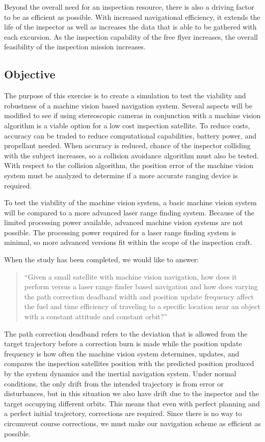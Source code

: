 \documentclass[journal, 10pt]{IEEEtran}
\begin{document}
Beyond the overall need for an inspection resource, there is also a driving factor to be as efficient as possible.  With increased navigational efficiency, it extends the life of the inspector as well as increases the data that is able to be gathered with each excursion.  As the inspection capability of the free flyer increases, the overall feasibility of the inspection mission increases.


\subsection{Objective}
The purpose of this exercise is to create a simulation to test the viability and robustness of a machine vision based navigation system.  Several aspects will be modified to see if using stereoscopic cameras in conjunction with a machine vision algorithm is a viable option for a low cost inspection satellite.  To reduce costs, accuracy can be traded to reduce computational capabilities, battery power, and propellant needed.  When accuracy is reduced, chance of the inspector colliding with the subject increases, so a collision avoidance algorithm must also be tested.  With respect to the collision algorithm, the position error of the machine vision system must be analyzed to determine if a more accurate ranging device is required.

To test the viability of the machine vision system, a basic machine vision system will be compared to a more advanced laser range finding system.  Because of the limited processing power available, advanced machine vision systems are not possible.  The processing power required for a laser range finding system is minimal, so more advanced versions fit within the scope of the inspection craft.

When the study has been completed, we would like to answer:

\begin{quote}
“Given a small satellite with machine vision navigation, how does it perform versus a laser range finder based navigation and how does varying the path correction deadband width and position update frequency affect the fuel and time efficiency of traveling to a specific location near an object with a constant attitude and constant orbit?”
\end{quote}

The path correction deadband refers to the deviation that is allowed from the target trajectory before a correction burn is made while the position update frequency is how often the machine vision system determines, updates, and compares the inspection satellites position with the predicted position produced by the system dynamics and the inertial navigation system.  Under normal conditions, the only drift from the intended trajectory is from error or disturbances, but in this situation we also have drift due to the inspector and the target occupying different orbits.  This means that even with perfect planning and a perfect initial trajectory, corrections are required.  Since there is no way to circumvent course corrections, we must make our navigation scheme as efficient as possible.
\end{document}
